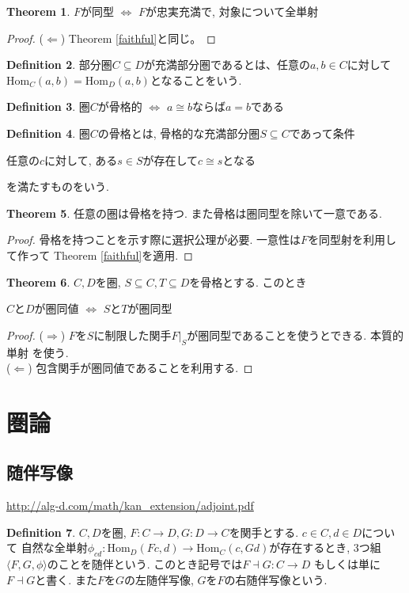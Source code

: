 \documentclass[a4paper,10pt]{article}
\theoremstyle{definition}
\newtheorem{thm}{\bfseries Theorem}[section]
\newtheorem{definition}[thm]{\bfseries Definition}
\begin{document}
\begin{thm}
    $F$が同型 $\Longleftrightarrow$
    $F$が忠実充満で, 対象について全単射
\end{thm}
\begin{proof}
($\Longleftarrow$) Theorem \ref{faithful}と同じ。
\end{proof}
\begin{definition}
    部分圏$C \subseteq D$が充満部分圏であるとは、任意の$a, b\in C$に対して
    $\textrm{Hom}_{C}(a,b) = \textrm{Hom}_{D}(a,b)$となることをいう.
\end{definition}
\begin{definition}
    圏$C$が骨格的 $\Longleftrightarrow$ $a \cong b$ならば$a=b$である
\end{definition}
\begin{definition}
    圏$C$の骨格とは, 骨格的な充満部分圏$S \subseteq C$であって条件
    \begin{center}
        任意の$c$に対して, ある$s\in S$が存在して$c \cong s$となる
    \end{center}
    を満たすものをいう.
\end{definition}
\begin{thm}
    任意の圏は骨格を持つ. また骨格は圏同型を除いて一意である.
\end{thm}
\begin{proof}
    骨格を持つことを示す際に選択公理が必要. 一意性は$F$を同型射を利用して作って
    Theorem \ref{faithful}を適用.
\end{proof}
\begin{thm}
    $C, D$を圏, $S \subseteq C, T \subseteq D$を骨格とする. このとき
    \begin{center}
        $C$と$D$が圏同値 $\Longleftrightarrow$ $S$と$T$が圏同型
    \end{center}
\end{thm}
\begin{proof}
    ($\Longrightarrow$) $F$を$S$に制限した関手$F|_S$が圏同型であることを使うとできる. 本質的単射
    を使う.\\
    ($\Longleftarrow$) 包含関手が圏同値であることを利用する.
\end{proof}
\section{圏論}
\subsection{随伴写像}
\url{http://alg-d.com/math/kan_extension/adjoint.pdf}
\begin{definition}
    $C, D$を圏, $F: C \rightarrow D, G: D \rightarrow C$を関手とする. $c \in C, d \in D$について
    自然な全単射$\phi_{cd}: \mathrm{Hom}_D(Fc, d) \rightarrow \mathrm{Hom}_C(c,Gd)$が存在するとき,
    3つ組$\langle F,G,\phi \rangle$のことを随伴という. このとき記号では$F \dashv G: C \rightarrow D$
    もしくは単に$F \dashv G$と書く. また$F$を$G$の左随伴写像, $G$を$F$の右随伴写像という.
\end{definition}
\end{document}
